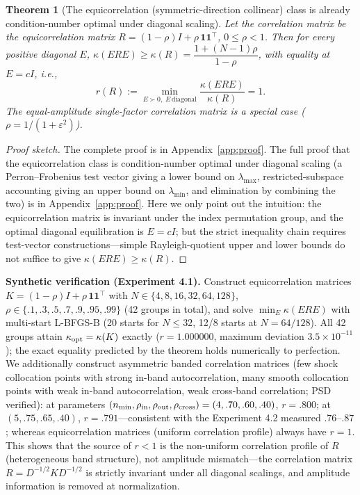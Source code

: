 \documentclass[11pt]{article}
\newtheorem{theorem}{Theorem}[section]
\numberwithin{equation}{section}
\begin{document}
\begin{theorem}[The equicorrelation (symmetric-direction collinear) class is already condition-number optimal under diagonal scaling]\label{thm:equicorr}
Let the correlation matrix be the equicorrelation matrix $R=(1-\rho)I+\rho\,\mathbf 1\mathbf 1^\top$, $0\le\rho<1$. Then for every positive diagonal $E$, $\kappa(ERE)\ge\kappa(R)=\dfrac{1+(N-1)\rho}{1-\rho}$, with equality at $E=cI$, i.e.,
\[
r(R):=\min_{E\succ0,\;E\,\text{diagonal}}\frac{\kappa(ERE)}{\kappa(R)}=1.
\]
The equal-amplitude single-factor correlation matrix is a special case ($\rho=1/(1+\varepsilon^2)$).
\end{theorem}
\begin{proof}[Proof sketch] The complete proof is in Appendix~\ref{app:proof}.
The full proof that the equicorrelation class is condition-number optimal under diagonal scaling (a Perron--Frobenius test vector giving a lower bound on $\lambda_{\max}$, restricted-subspace accounting giving an upper bound on $\lambda_{\min}$, and elimination by combining the two) is in Appendix~\ref{app:proof}. Here we only point out the intuition: the equicorrelation matrix is invariant under the index permutation group, and the optimal diagonal equilibration is $E=cI$; but the strict inequality chain requires test-vector constructions---simple Rayleigh-quotient upper and lower bounds do not suffice to give $\kappa(ERE)\ge\kappa(R)$.
\end{proof}

\noindent\textbf{Synthetic verification (Experiment 4.1).} Construct equicorrelation matrices $K=(1-\rho)I+\rho\,\mathbf 1\mathbf 1^\top$ with $N\in\{4,8,16,32,64,128\}$, $\rho\in\{.1,.3,.5,.7,.9,.95,.99\}$ (42 groups in total), and solve $\min_E\kappa(ERE)$ with multi-start L-BFGS-B (20 starts for $N\le32$, 12/8 starts at $N=64/128$). All 42 groups attain $\kappa_{\rm opt}=\kappa(K)$ exactly ($r=1.000000$, maximum deviation $3.5\times10^{-11}$); the exact equality predicted by the theorem holds numerically to perfection. We additionally construct asymmetric banded correlation matrices (few shock collocation points with strong in-band autocorrelation, many smooth collocation points with weak in-band autocorrelation, weak cross-band correlation; PSD verified): at parameters $(n_{\rm min},\rho_{\rm in},\rho_{\rm out},\rho_{\rm cross})=(4,.70,.60,.40)$, $r=.800$; at $(5,.75,.65,.40)$, $r=.791$---consistent with the Experiment 4.2 measured $.76$--$.87$; whereas equicorrelation matrices (uniform correlation profile) always have $r=1$. This shows that the source of $r<1$ is the non-uniform correlation profile of $R$ (heterogeneous band structure), not amplitude mismatch---the correlation matrix $R=D^{-1/2}KD^{-1/2}$ is strictly invariant under all diagonal scalings, and amplitude information is removed at normalization.
\end{document}
